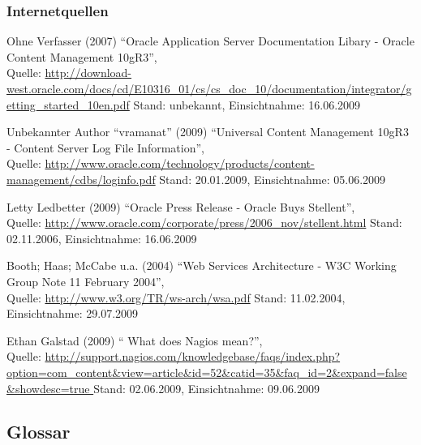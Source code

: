 \documentclass[12pt, a4paper, headsepline]{article}
\begin{document}
\subsubsection{Internetquellen}
\begin{thebibliography}{xxxxxxxx}
	 
	  Ohne Verfasser (2007) "`Oracle Application Server Documentation Libary - Oracle Content Management 10gR3"', \\ Quelle: \url{http://download-west.oracle.com/docs/cd/E10316_01/cs/cs_doc_10/documentation/integrator/getting_started_10en.pdf} \newline Stand: unbekannt, Einsichtnahme: 16.06.2009
	 
	 	  Unbekannter Author "`vramanat"' (2009) "`Universal Content Management 10gR3 - Content Server Log File Information"', \\ Quelle: \url{http://www.oracle.com/technology/products/content-management/cdbs/loginfo.pdf} \newline Stand: 20.01.2009, Einsichtnahme: 05.06.2009
	 	 
	 	  Letty Ledbetter (2009) "`Oracle Press Release - Oracle Buys Stellent"', \\ Quelle: \url{http://www.oracle.com/corporate/press/2006_nov/stellent.html} \newline Stand: 02.11.2006, Einsichtnahme: 16.06.2009
	 	 
	 	 	  Booth; Haas; McCabe u.a. (2004) "`Web Services Architecture - W3C Working Group Note 11 February 2004"', \\ Quelle: \url{http://www.w3.org/TR/ws-arch/wsa.pdf} \newline Stand: 11.02.2004, Einsichtnahme: 29.07.2009
 	
 		 	 	  Ethan Galstad (2009) "`	What does Nagios mean?"', \\ Quelle: \url{http://support.nagios.com/knowledgebase/faqs/index.php?option=com\_content&view=article&id=52&catid=35&faq\_id=2&expand=false&showdesc=true	} \newline Stand: 02.06.2009, Einsichtnahme: 09.06.2009 
	 	 
 	 
	 	 
\end{thebibliography}

\newpage
\subsection{Glossar}
\renewcommand{\glossaryname}{}
\makeglossaries
\printglossaries
\end{document}

